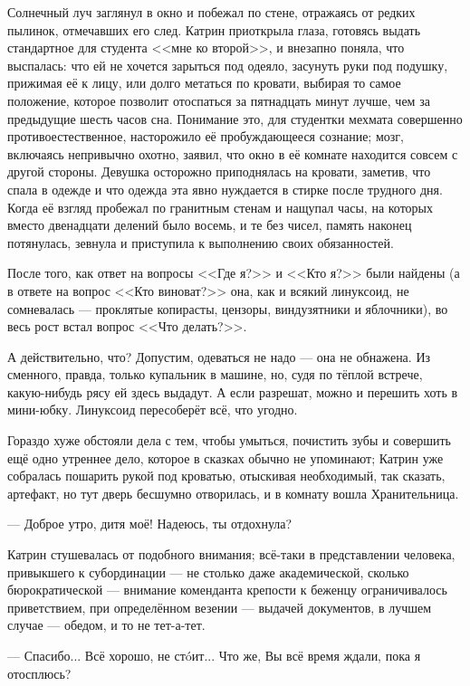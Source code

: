Солнечный луч заглянул в окно и побежал по стене, отражаясь от редких пылинок, отмечавших его след.
Катрин приоткрыла глаза, готовясь выдать стандартное для студента <<мне ко второй>>, и внезапно поняла, что выспалась:
что ей не хочется зарыться под одеяло, засунуть руки под подушку, прижимая её к лицу, или долго метаться по кровати,
выбирая то самое положение, которое позволит отоспаться за пятнадцать минут лучше, чем за предыдущие шесть часов сна.
Понимание это, для студентки мехмата совершенно противоестественное, насторожило её пробуждающееся сознание;
мозг, включаясь непривычно охотно, заявил, что окно в её комнате находится совсем с другой стороны.
Девушка осторожно приподнялась на кровати, заметив,
что спала в одежде и что одежда эта явно нуждается в стирке после трудного дня.
Когда её взгляд пробежал по гранитным стенам и нащупал часы, на которых вместо двенадцати делений было восемь,
и те без чисел, память наконец потянулась, зевнула и приступила к выполнению своих обязанностей.

После того, как ответ на вопросы <<Где я?>> и <<Кто я?>> были найдены
(а в ответе на вопрос <<Кто виноват?>> она, как и всякий линуксоид, не сомневалась ---
проклятые копирасты, цензоры, виндузятники и яблочники), во весь рост встал вопрос <<Что делать?>>.

А действительно, что? Допустим, одеваться не надо --- она не обнажена.
Из сменного, правда, только купальник в машине, но, судя по тёплой встрече, какую-нибудь рясу ей здесь выдадут.
А если разрешат, можно и перешить хоть в мини-юбку. Линуксоид пересоберёт всё, что угодно.

Гораздо хуже обстояли дела с тем, чтобы умыться, почистить зубы и совершить ещё одно утреннее дело,
которое в сказках обычно не упоминают;
Катрин уже собралась пошарить рукой под кроватью, отыскивая необходимый, так сказать, артефакт,
но тут дверь бесшумно отворилась, и в комнату вошла Хранительница.

--- Доброе утро, дитя моё! Надеюсь, ты отдохнула?

Катрин стушевалась от подобного внимания; всё-таки в представлении человека, привыкшего к субординации ---
 не столько даже академической, сколько бюрократической --- внимание коменданта крепости к беженцу ограничивалось приветствием,
 при определённом везении --- выдачей документов, в лучшем случае --- обедом, и то не тет-а-тет.

--- Спасибо... Всё хорошо, не ст\'oит... Что же, Вы всё время ждали, пока я отосплюсь?

